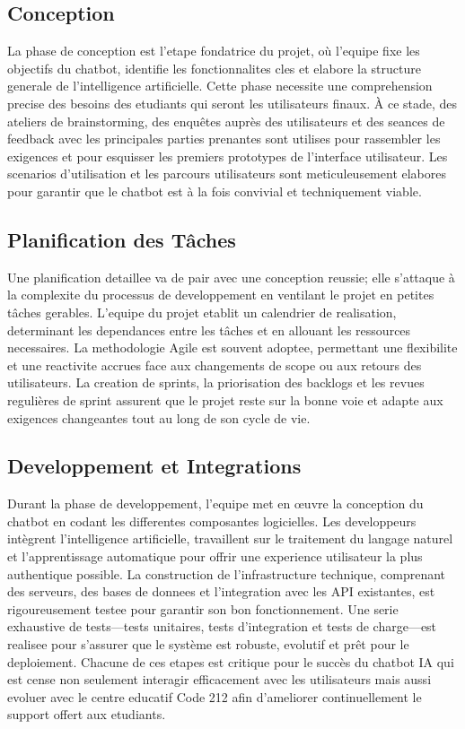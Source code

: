 \subsection{Conception}
La phase de conception est l'etape fondatrice du projet, où l'equipe fixe les objectifs du chatbot, identifie les fonctionnalites cles et elabore la structure generale de l'intelligence artificielle. Cette phase necessite une comprehension precise des besoins des etudiants qui seront les utilisateurs finaux. À ce stade, des ateliers de brainstorming, des enquêtes auprès des utilisateurs et des seances de feedback avec les principales parties prenantes sont utilises pour rassembler les exigences et pour esquisser les premiers prototypes de l'interface utilisateur. Les scenarios d'utilisation et les parcours utilisateurs sont meticuleusement elabores pour garantir que le chatbot est à la fois convivial et techniquement viable.

\subsection{Planification des Tâches}
Une planification detaillee va de pair avec une conception reussie; elle s'attaque à la complexite du processus de developpement en ventilant le projet en petites tâches gerables. L'equipe du projet etablit un calendrier de realisation, determinant les dependances entre les tâches et en allouant les ressources necessaires. La methodologie Agile est souvent adoptee, permettant une flexibilite et une reactivite accrues face aux changements de scope ou aux retours des utilisateurs. La creation de sprints, la priorisation des backlogs et les revues regulières de sprint assurent que le projet reste sur la bonne voie et adapte aux exigences changeantes tout au long de son cycle de vie.

\subsection{Developpement et Integrations}
Durant la phase de developpement, l'equipe met en œuvre la conception du chatbot en codant les differentes composantes logicielles. Les developpeurs intègrent l'intelligence artificielle, travaillent sur le traitement du langage naturel et l'apprentissage automatique pour offrir une experience utilisateur la plus authentique possible. La construction de l'infrastructure technique, comprenant des serveurs, des bases de donnees et l'integration avec les API existantes, est rigoureusement testee pour garantir son bon fonctionnement. Une serie exhaustive de tests—tests unitaires, tests d'integration et tests de charge—est realisee pour s'assurer que le système est robuste, evolutif et prêt pour le deploiement.
Chacune de ces etapes est critique pour le succès du chatbot IA qui est cense non seulement interagir efficacement avec les utilisateurs mais aussi evoluer avec le centre educatif Code 212 afin d'ameliorer continuellement le support offert aux etudiants.

